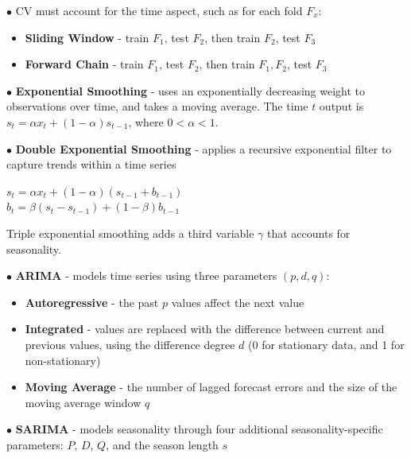 \documentclass[letterpaper, 10.5pt,landscape]{article}
\begin{document}
\begin{multicols*}{3}
$\bullet$ CV must account for the time aspect, such as for each fold $F_x$:
\begin{itemize}[label={--},leftmargin=4mm]
\vspace{-3pt}
\item \textbf{Sliding Window} - train $F_1$, test $F_2$, then train $F_2$, test $F_3$
\vspace{-3pt}
\item \textbf{Forward Chain} - train $F_1$, test $F_2$, then train $F_1, F_2$, test $F_3$
\end{itemize}

$\bullet$ \textbf{Exponential Smoothing} - uses an exponentially decreasing weight to observations over time, and takes a moving average. The time $t$ output is $s_t = \alpha x_t + (1-\alpha)s_{t-1}$, where  $0 < \alpha < 1$.
\smallskip

$\bullet$ \textbf{Double Exponential Smoothing} - applies a recursive exponential filter to capture trends within a time series
    \begin{center}
    \vspace{-2.5mm}
    $s_t = \alpha x_t + (1-\alpha)(s_{t-1} + b_{t-1})$\\
    $b_t = \beta (s_t - s_{t-1}) + (1-\beta)b_{t-1}$\\
    \vspace{-2mm}
    \end{center}
Triple exponential smoothing adds a third variable
$\gamma$ that accounts for seasonality.
\smallskip

$\bullet$ \textbf{ARIMA} - models time series using three parameters $(p,d,q)$:

\begin{itemize}[label={--},leftmargin=4mm]
\vspace{-3pt}
\item \textbf{Autoregressive} - the past $p$ values affect the next value
\vspace{-3pt}
\item \textbf{Integrated} - values are replaced with the difference between current and previous values, using the difference degree $d$ (0 for stationary data, and 1 for non-stationary)
\vspace{-3pt}
\item \textbf{Moving Average} - the number of lagged forecast errors and the size of the moving average window $q$
\end{itemize}

$\bullet$ \textbf{SARIMA} - models seasonality through four additional seasonality-specific parameters: $P$, $D$, $Q$, and the season length $s$
\smallskip


\end{multicols*}
\end{document}
